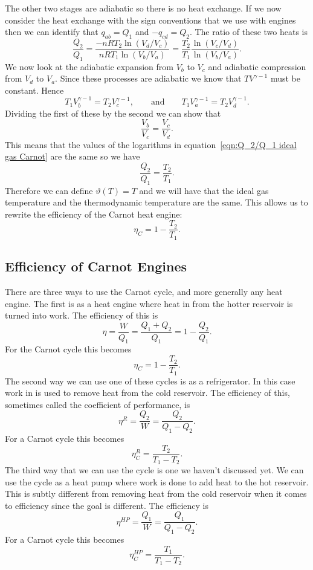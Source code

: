 \documentclass[a4paper]{article}
\begin{document}
    The other two stages are adiabatic so there is no heat exchange.
    If we now consider the heat exchange with the sign conventions that we use with engines then we can identify that \(q_{ab} = Q_1\) and \(-q_{cd} = Q_2\).
    The ratio of these two heats is
    \begin{equation}\label{eqn:Q_2/Q_1 ideal gas Carnot}
        \frac{Q_2}{Q_1} = \frac{-nRT_2\ln(V_d/V_c)}{nRT_1\ln(V_b/V_a)} = \frac{T_2}{T_1}\frac{\ln(V_c/V_d)}{\ln(V_b/V_a)}.
    \end{equation}
    We now look at the adiabatic expansion from \(V_b\) to \(V_c\) and adiabatic compression from \(V_d\) to \(V_a\).
    Since these processes are adiabatic we know that \(TV^{\gamma - 1}\) must be constant.
    Hence
    \[T_1V_b^{\gamma-1} = T_2V_c^{\gamma-1}, \qquad\text{and}\qquad T_1V_a^{\gamma-1} = T_2V_d^{\gamma-1}.\]
    Dividing the first of these by the second we can show that
    \[\frac{V_b}{V_c} = \frac{V_c}{V_d}.\]
    This means that the values of the logarithms in equation~\ref{eqn:Q_2/Q_1 ideal gas Carnot} are the same so we have
    \[\frac{Q_2}{Q_1} = \frac{T_2}{T_1}.\]
    Therefore we can define \(\vartheta(T) = T\) and we will have that the ideal gas temperature and the thermodynamic temperature are the same.
    This allows us to rewrite the efficiency of the Carnot heat engine:
    \[\eta_C = 1 - \frac{T_2}{T_1}.\]
    
    \subsection{Efficiency of Carnot Engines}
    There are three ways to use the Carnot cycle, and more generally any heat engine.
    The first is as a heat engine where heat in from the hotter reservoir is turned into work.
    The efficiency of this is
    \[\eta = \frac{W}{Q_1} = \frac{Q_1 + Q_2}{Q_1} = 1 - \frac{Q_2}{Q_1}.\]
    For the Carnot cycle this becomes
    \[\eta_C = 1 - \frac{T_2}{T_1}.\]
    The second way we can use one of these cycles is as a refrigerator.
    In this case work in is used to remove heat from the cold reservoir.
    The efficiency of this, sometimes called the coefficient of performance, is
    \[\eta^R = \frac{Q_2}{W} = \frac{Q_2}{Q_1 - Q_2}.\]
    For a Carnot cycle this becomes
    \[\eta_C^R = \frac{T_2}{T_1 - T_2}.\]
    The third way that we can use the cycle is one we haven't discussed yet.
    We can use the cycle as a heat pump where work is done to add heat to the hot reservoir.
    This is subtly different from removing heat from the cold reservoir when it comes to efficiency since the goal is different.
    The efficiency is
    \[\eta^{HP} = \frac{Q_1}{W} = \frac{Q_1}{Q_1 - Q_2}.\]
    For a Carnot cycle this becomes
    \[\eta_C^{HP} = \frac{T_1}{T_1 - T_2}.\]
    
\end{document}

